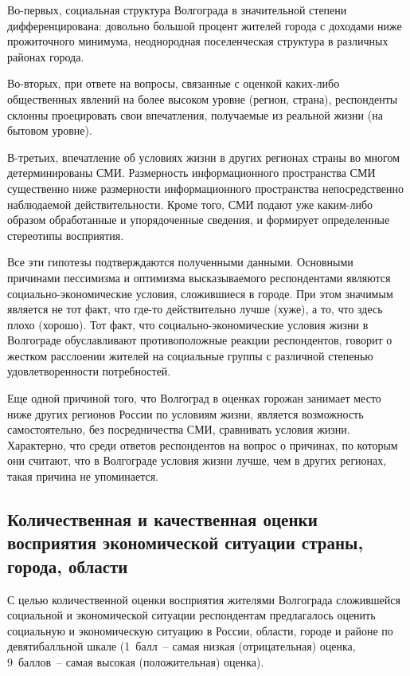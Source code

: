   Во-первых, социальная структура Волгограда в значительной степени
  дифференцирована: довольно большой процент жителей города с доходами ниже
  прожиточного минимума, неоднородная поселенческая структура в различных
  районах города.
  
  Во-вторых, при ответе на вопросы, связанные с оценкой каких-либо общественных
  явлений на более высоком уровне (регион, страна), респонденты склонны
  проецировать свои впечатления, получаемые из реальной жизни (на бытовом уровне).

  В-третьих, впечатление об условиях жизни в других регионах страны во многом
  детерминированы СМИ. Размерность информационного пространства СМИ существенно
  ниже размерности информационного пространства непосредственно наблюдаемой
  действительности. Кроме того, СМИ подают уже каким-либо образом обработанные
  и упорядоченные сведения, и формирует определенные стереотипы восприятия.
  
  Все эти гипотезы подтверждаются полученными данными. Основными причинами
  пессимизма и оптимизма высказываемого респондентами являются
  социально-экономические условия, сложившиеся в городе. При этом значимым
  является не тот факт, что где-то действительно лучше (хуже), а то, что здесь
  плохо (хорошо). Тот факт, что социально-экономические условия жизни в
  Волгограде обуславливают противоположные реакции респондентов, говорит о
  жестком расслоении жителей на социальные группы с различной степенью
  удовлетворенности потребностей.
  
  Еще одной причиной того, что Волгоград в оценках горожан занимает место ниже
  других регионов России по условиям жизни, является возможность
  самостоятельно, без посредничества СМИ, сравнивать условия жизни. Характерно, 
  что среди ответов респондентов на вопрос о причинах, по которым они считают,
  что в Волгограде условия жизни лучше, чем в других регионах, такая причина не
  упоминается.
  
  \subsection{Количественная и качественная оценки восприятия экономической
    ситуации страны, города, области}
    
  С целью количественной оценки восприятия жителями Волгограда сложившейся
  социальной и экономической ситуации респондентам предлагалось оценить
  социальную и экономическую ситуацию в России, области, городе и районе по
  девятибалльной шкале (1~балл~-- самая низкая (отрицательная) оценка,
  9~баллов~-- самая высокая (положительная) оценка).
  
